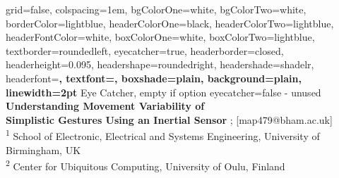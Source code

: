 \documentclass[a0paper,portrait]{baposter}
\begin{document}







\begin{poster}%
  {
  grid=false,
  colspacing=1em,
  bgColorOne=white,
  bgColorTwo=white,
  borderColor=lightblue,
  headerColorOne=black,
  headerColorTwo=lightblue,
  headerFontColor=white,
  boxColorOne=white,
  boxColorTwo=lightblue,
  textborder=roundedleft,
  eyecatcher=true,
  headerborder=closed,
  headerheight=0.095\textheight,
  headershape=roundedright,
  headershade=shadelr,
  headerfont=\Large\bf\textsc, %
  textfont={\setlength{\parindent}{1.5em}},
  boxshade=plain,
  background=plain,
  linewidth=2pt
  }
{
	Eye Catcher, empty if option eyecatcher=false - unused
}
{\bf
  {Understanding Movement Variability of \\ Simplistic Gestures Using an Inertial Sensor}
}
{
	{; [map479@bham.ac.uk]  } \\ 
	{\smaller
	\textsuperscript{1} School of Electronic, Electrical and Systems Engineering, University of Birmingham, UK \\
	\textsuperscript{2} Center for Ubiquitous Computing, University of Oulu, Finland }
}
  {%
  	\fbox{
    \begin{minipage}{11em}
    

\end{minipage}}}
\end{poster}
\end{document}
